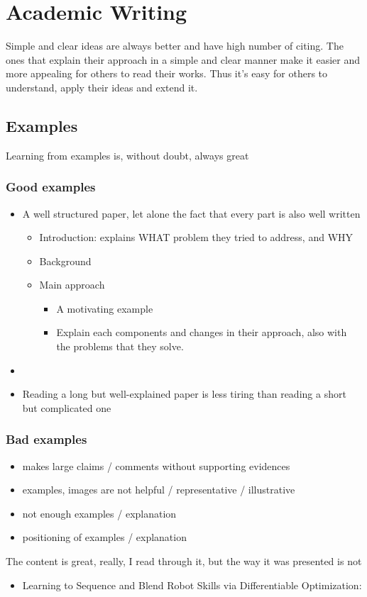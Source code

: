 \chapter{Academic Writing}
Simple and clear ideas are always better and have high number of citing. The ones that explain their approach in a simple and clear manner make it easier and more appealing for others to read their works. Thus it's easy for others to understand, apply their ideas and extend it.

\section{Examples}
Learning from examples is, without doubt, always great

\subsection{Good examples}
\begin{itemize}
	\item A well structured paper, let alone the fact that every part is also well written \cite{schaul2015prioritized}
	\begin{itemize}
		\item Introduction: explains WHAT problem they tried to address, and WHY
		\item Background
		\item Main approach
		\begin{itemize}
			\item A motivating example
			\item Explain each components and changes in their approach, also with the problems that they solve.
		\end{itemize}
	\end{itemize}
	\item \cite{andrychowicz2017hindsight}
	\item Reading a long but well-explained paper is less tiring than reading a short but complicated one \cite{silver2016mastering, silver2017mastering}
\end{itemize}

\subsection{Bad examples}
\begin{itemize}
	\item makes large claims / comments without supporting evidences
	\item examples, images are not helpful / representative / illustrative
	\item not enough examples / explanation
	\item positioning of examples / explanation
\end{itemize}
The content is great, really, I read through it, but the way it was presented is not
\begin{itemize}
	\item Learning to Sequence and Blend Robot Skills via Differentiable Optimization:
\end{itemize}
